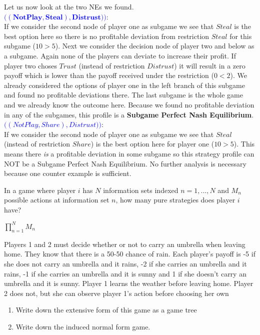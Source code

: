\documentclass[../main.tex]{subfiles}
\begin{document}
\begin{solution}
\begin{itemize}
		Let us now look at the two NEs we found.\\
		\textcolor{blue}{$\mathbf{\Big((Not Play, Steal),Distrust)\Big)}$}:\\
		If we consider the second node of player one as subgame we see that $Steal$ is the best option here so there is no profitable deviation from restriction $Steal$ for this subgame ($10>5$).
		Next we consider the decision node of player two and below as a subgame.
		Again none of the players can deviate to increase their profit.
		If player two choses $Trust$ (instead of restriction $Distrust$) it will result in a zero payoff which is lower than the payoff received under the restriction ($0<2$).
		We already considered the options of player one in the left branch of this subgame and found no profitable deviations there.
		The last subgame is the whole game and we already know the outcome here.
		Because we found no profitable deviation in any of the subgames, this profile is a \textbf{Subgame Perfect Nash Equilibrium}.
		\textcolor{blue}{$\Big((Not Play, Share),Distrust)\Big)$}:\\
		If we consider the second node of player one as subgame we see that $Steal$ (instead of restriction $Share$) is the best option here for player one ($10>5$).
		This means there \emph{is} a profitable deviation in some subgame so this strategy profile can NOT be a Subgame Perfect Nash Equilibrium. 
		No further analysis is necessary because one counter example is sufficient.
\end{itemize}
\end{solution}

\begin{question}
In a game where player $i$ has $N$ information sets indexed $n = 1, ..., N$ and $M_n$ possible actions at information set $n$, how many pure strategies does player $i$ have?
\end{question}

\begin{solution}
$\prod\limits_{n=1}^N M_n$
\end{solution}

\begin{question}[Rain]
Players 1 and 2 must decide whether or not to carry an umbrella when leaving home. They know that there is a 50-50 chance of rain. Each player's payoff is -5 if she does not carry an umbrella and it rains, -2 if she carries an umbrella and it rains, -1 if she carries an umbrella and it is sunny and 1 if she doesn't carry an umbrella and it is sunny. Player 1 learns the weather before leaving home. Player 2 does not, but she can observe player 1's action before choosing her own
\begin{enumerate}
\item Write down the extensive form of this game as a game tree
\item Write down the induced normal form game.
\end{enumerate}
\end{question}
\end{document}
